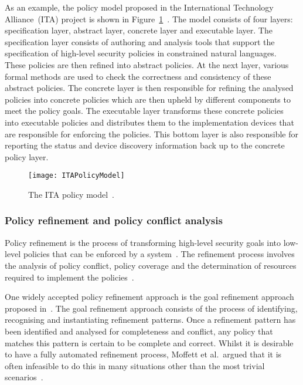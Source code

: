 As an example, the policy model proposed in the International
Technology Alliance~(ITA) project is shown in
Figure~\ref{fig:ITAPolicyModel}~\cite{KS08}. The model consists of
four layers: specification layer, abstract layer, concrete layer and
executable layer. The specification layer consists of authoring and
analysis tools that support the specification of high-level security
policies in constrained natural languages. These policies are then
refined into abstract policies. At the next layer, various formal
methods are used to check the correctness and consistency of these
abstract policies. The concrete layer is then responsible for refining
the analysed policies into concrete policies which are then upheld by
different components to meet the policy goals. The executable layer
transforms these concrete policies into executable policies and
distributes them to the implementation devices that are responsible
for enforcing the policies. This bottom layer is also responsible for
reporting the status and device discovery information back up to the
concrete policy layer.

\begin{figure}[htbp]
 \centering
 \texttt{[image: ITAPolicyModel]}
 \caption{The ITA policy model~\cite{KS08}.}
 \label{fig:ITAPolicyModel}
\end{figure}

\subsubsection{Policy refinement and policy conflict analysis}
\label{PolicyRefinementAndPolicyConflictAnalysis}
Policy refinement is the process of transforming high-level security
goals into low-level policies that can be enforced by a
system~\cite{JDM91}.  The refinement process involves the analysis of
policy conflict, policy coverage and the determination of resources
required to implement the policies~\cite{JDM91}.

One widely accepted policy refinement approach is the goal refinement
approach proposed in~\cite{RD97}. The goal refinement approach
consists of the process of identifying, recognising and instantiating
refinement patterns. Once a refinement pattern has been identified and
analysed for completeness and conflict, any policy that matches this
pattern is certain to be complete and correct. Whilst it is desirable
to have a fully automated refinement process, Moffett et al.\ argued
that it is often infeasible to do this in many situations other than
the most trivial scenarios~\cite{JDM93A}.

